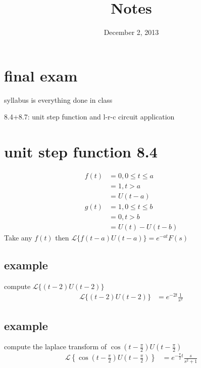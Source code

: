 \documentclass{article}
\begin{document}
\title{Notes}
\date{December 2, 2013}
\maketitle
\section*{final exam}
syllabus is everything done in class

8.4+8.7: unit step function and l-r-c circuit application

\section*{unit step function 8.4}
\begin{align*}
  f(t)&=0,0\leq t\leq a\\
      &=1, t>a\\
      &=U(t-a)\\
  g(t)&=1,0\leq t\leq b\\
      &=0, t>b\\
      &=U(t)-U(t-b)
\end{align*}
Take any $f(t)$ then $\mathcal{L}\{f(t-a)U(t-a)\}=e^{-at}F(s)$
\subsection*{example}
compute $\mathcal{L}\{(t-2)U(t-2)\}$
\begin{align*}
  \mathcal{L}\{(t-2)U(t-2)\}&=e^{-2t}\frac{1}{s^2}
\end{align*}
\subsection*{example}
compute the laplace transform of $\cos(t-\frac{\pi}{2})U(t-\frac{\pi}{2})$
\begin{align*}
  \mathcal{L}{\left\{\cos\left(t-\frac{\pi}{2}\right)U\left(t-\frac{\pi}{2}\right)\right\}}&=e^{-\frac{\pi}{2}t}\frac{s}{s^2+1}
\end{align*}
\end{document}

